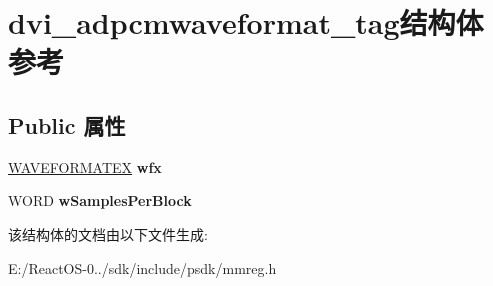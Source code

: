 \hypertarget{structdvi__adpcmwaveformat__tag}{}\section{dvi\+\_\+adpcmwaveformat\+\_\+tag结构体 参考}
\label{structdvi__adpcmwaveformat__tag}
\subsection*{Public 属性}
\begin{DoxyCompactItemize}
\item 
\mbox{\label{structdvi__adpcmwaveformat__tag_a1c5d122f5b46788bd7ad98923c6368cd}} 
\hyperlink{struct_w_a_v_e_f_o_r_m_a_t_e_x}{W\+A\+V\+E\+F\+O\+R\+M\+A\+T\+EX} {\bfseries wfx}
\item 
\mbox{\label{structdvi__adpcmwaveformat__tag_a32a167f43d38403ef59bc75540d33c53}} 
W\+O\+RD {\bfseries w\+Samples\+Per\+Block}
\end{DoxyCompactItemize}


该结构体的文档由以下文件生成\+:\begin{DoxyCompactItemize}
\item 
E\+:/\+React\+O\+S-\/0../sdk/include/psdk/mmreg.\+h\end{DoxyCompactItemize}
